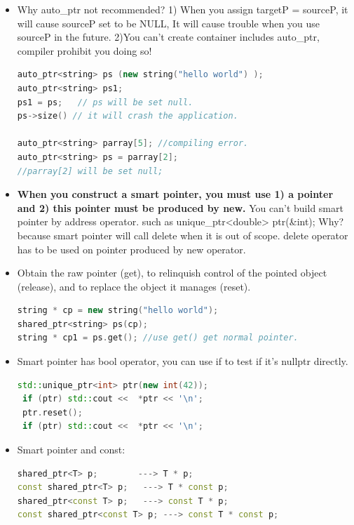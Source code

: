 \documentclass[a4paper,12pt,twoside]{book}
\begin{document}
\begin{itemize}
\item Why auto\_ptr not recommended? 1) When you assign targetP = sourceP, it will cause sourceP set to be NULL, It will cause trouble when you use sourceP in the future.  2)You can't create container includes auto\_ptr, compiler prohibit you doing so!
\begin{lstlisting}[frame=single, language=c++]
auto_ptr<string> ps (new string("hello world") );
auto_ptr<string> ps1;
ps1 = ps;   // ps will be set null.
ps->size() // it will crash the application.

auto_ptr<string> parray[5]; //compiling error.
auto_ptr<string> ps = parray[2];
//parray[2] will be set null;
\end{lstlisting}

\item \textbf{When you construct a smart pointer, you must use 1) a pointer and 2) this pointer must be produced by new.} You can't build smart pointer by address operator. such as unique\_ptr<double> ptr(\&int);   Why? because smart pointer will call delete when it is out of scope.  delete operator has to be used on pointer produced by new operator.

\item Obtain the raw pointer (get), to relinquish control of the pointed object (release), and to replace the object it manages (reset).
\begin{lstlisting}[frame=single, language=c++]
string * cp = new string("hello world");
shared_ptr<string> ps(cp);
string * cp1 = ps.get(); //use get() get normal pointer.
\end{lstlisting}


\item Smart pointer has bool operator, you can use if to test if it's nullptr directly.
\begin{lstlisting}[frame=single, language=c++]
 std::unique_ptr<int> ptr(new int(42));
 if (ptr) std::cout <<  *ptr << '\n';
 ptr.reset();
 if (ptr) std::cout <<  *ptr << '\n';
\end{lstlisting}

\item Smart pointer and const:
\begin{lstlisting}[frame=single, language=c++]
shared_ptr<T> p;        ---> T * p;
const shared_ptr<T> p;   ---> T * const p;
shared_ptr<const T> p;   ---> const T * p;
const shared_ptr<const T> p; ---> const T * const p;
\end{lstlisting}

\end{itemize}
\end{document}
